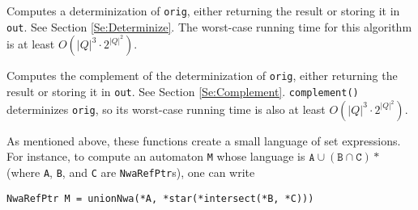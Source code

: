\begin{functionlist}
    Computes a determinization of \texttt{orig}, either returning the
    result or storing it in \texttt{out}.
    See Section \ref{Se:Determinize}. The worst-case running time for this
    algorithm is at least $O({|Q|^3} \cdot2^{|Q|^2})$.

\clearpage
    Computes the complement of the determinization of \texttt{orig},
    either returning the result or storing it in \texttt{out}.
    See Section
    \ref{Se:Complement}. %
    \texttt{complement()} determinizes \texttt{orig}, so its worst-case
    running time is also at least $O({|Q|^3} \cdot2^{|Q|^2})$.


\end{functionlist}

As mentioned above, these functions create a small language of set
expressions. For instance, to compute an automaton \texttt{M} whose language
is $\texttt{A} \cup (\texttt{B} \cap \texttt{C})*$ (where \texttt{A},
\texttt{B}, and \texttt{C} are \texttt{NwaRefPtr}s), one can write
\begin{center}
  \texttt{NwaRefPtr M = unionNwa(*A, *star(*intersect(*B, *C)))}
\end{center}


